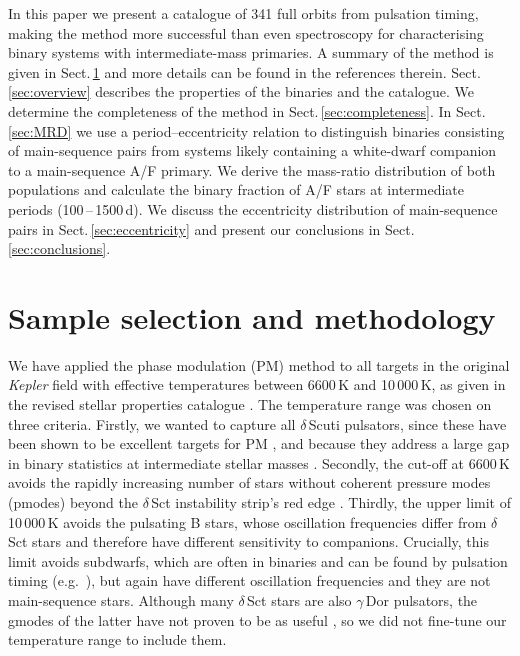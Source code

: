 \documentclass[a4paper,fleqn,usenatbib]{mnras}
\begin{document}
In this paper we present a catalogue of 341 full orbits from pulsation timing, making the method more successful than even spectroscopy for characterising binary systems with intermediate-mass primaries. A summary of the method is given in Sect.\,\ref{sec:method} and more details can be found in the references therein. Sect.\,\ref{sec:overview} describes the properties of the binaries and the catalogue. We determine the completeness of the method in Sect.\,\ref{sec:completeness}. In Sect.\,\ref{sec:MRD} we use a period--eccentricity relation to distinguish binaries consisting of main-sequence pairs from systems likely containing a white-dwarf companion to a main-sequence A/F primary. We derive the mass-ratio distribution of both populations and calculate the binary fraction of A/F stars at intermediate periods (100\,--\,1500\,d). We discuss the eccentricity distribution of main-sequence pairs in Sect.\,\ref{sec:eccentricity} and present our conclusions in Sect.\,\ref{sec:conclusions}.



\section{Sample selection and methodology}
\label{sec:method}

We have applied the phase modulation (PM) method \citep{murphyetal2014} to all targets in the original \textit{Kepler} field with effective temperatures between 6600\,K and 10\,000\,K, as given in the revised stellar properties catalogue \citep{huberetal2014}. The temperature range was chosen on three criteria. Firstly, we wanted to capture all $\delta$\,Scuti pulsators, since these have been shown to be excellent targets for PM \citep{comptonetal2016}, and because they address a large gap in binary statistics at intermediate stellar masses \citep{moe&distefano2017}. Secondly, the cut-off at 6600\,K avoids the rapidly increasing number of stars without coherent pressure modes (p\:modes) beyond the $\delta$\,Sct instability strip's red edge \citep{dupretetal2005b}. Thirdly, the upper limit of 10\,000\,K avoids the pulsating B stars, whose oscillation frequencies differ from $\delta$\,Sct stars and therefore have different sensitivity to companions. Crucially, this limit avoids subdwarfs, which are often in binaries and can be found by pulsation timing (e.g.\ \citealt{kawaleretal2010,teltingetal2012}), but again have different oscillation frequencies and they are not main-sequence stars. Although many $\delta$\,Sct stars are also $\gamma$\,Dor pulsators, the g\:modes of the latter have not proven to be as useful \citep{comptonetal2016}, so we did not fine-tune our temperature range to include them.
\end{document}
